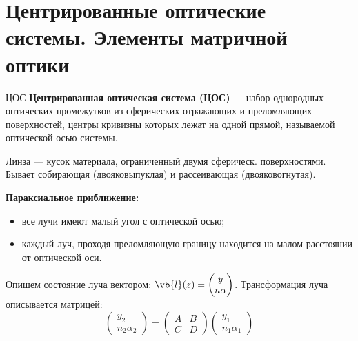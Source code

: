 \section{Центрированные оптические системы. Элементы матричной оптики}

\begin{definition}{ЦОС}{}
	\textbf{Центрированная оптическая система (ЦОС)} --- набор однородных оптических промежутков из сферических отражающих и преломляющих поверхностей, центры кривизны которых лежат на одной прямой, называемой оптической осью системы.
\end{definition}

Линза --- кусок материала, ограниченный двумя сферическ. поверхностями. Бывает собирающая (двояковыпуклая) и рассеивающая (двояковогнутая).

\textbf{Параксиальное приближение:}
\begin{itemize}
	\item все лучи имеют малый угол с оптической осью;
	\item каждый луч, проходя преломляющую границу находится на малом расстоянии от оптической оси.
\end{itemize}

Опишем состояние луча вектором: $\vb{l}(z) = \begin{pmatrix} y \\ n\alpha \end{pmatrix}$. Трансформация луча описывается матрицей:
\begin{equation*}
	\begin{pmatrix} y_2 \\ n_2 \alpha_2 \end{pmatrix} = \begin{pmatrix} A & B \\ C & D \end{pmatrix} \begin{pmatrix} y_1 \\ n_1 \alpha_1 \end{pmatrix}
\end{equation*}

